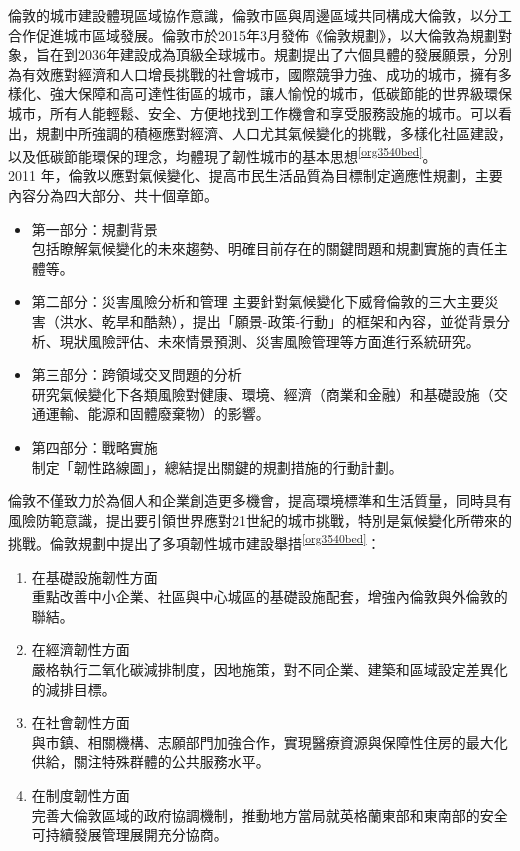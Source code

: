 \documentclass[a4paper,12pt]{article}
\begin{document}
\begin{enumerate}
倫敦的城市建設體現區域協作意識，倫敦市區與周邊區域共同構成大倫敦，以分工合作促進城市區域發展。倫敦市於2015年3月發佈《倫敦規劃》，以大倫敦為規劃對象，旨在到2036年建設成為頂級全球城市。規劃提出了六個具體的發展願景，分別為有效應對經濟和人口增長挑戰的社會城市，國際競爭力強、成功的城市，擁有多樣化、強大保障和高可達性街區的城市，讓人愉悅的城市，低碳節能的世界級環保城市，所有人能輕鬆、安全、方便地找到工作機會和享受服務設施的城市。可以看出，規劃中所強調的積極應對經濟、人口尤其氣候變化的挑戰，多樣化社區建設，以及低碳節能環保的理念，均體現了韌性城市的基本思想\textsuperscript{\ref{org3540bed}}。\\

2011 年，倫敦以應對氣候變化、提高市民生活品質為目標制定適應性規劃，主要內容分為四大部分、共十個章節。\\
\begin{itemize}
\item 第一部分：規劃背景\\
包括瞭解氣候變化的未來趨勢、明確目前存在的關鍵問題和規劃實施的責任主體等。\\
\item 第二部分：災害風險分析和管理  主要針對氣候變化下威脅倫敦的三大主要災害（洪水、乾旱和酷熱），提出「願景-政策-行動」的框架和內容，並從背景分析、現狀風險評估、未來情景預測、災害風險管理等方面進行系統研究。\\
\item 第三部分：跨領域交叉問題的分析\\
研究氣候變化下各類風險對健康、環境、經濟（商業和金融）和基礎設施（交通運輸、能源和固體廢棄物）的影響。\\
\item 第四部分：戰略實施\\
制定「韌性路線圖」，總結提出關鍵的規劃措施的行動計劃。\\
\end{itemize}

倫敦不僅致力於為個人和企業創造更多機會，提高環境標準和生活質量，同時具有風險防範意識，提出要引領世界應對21世紀的城市挑戰，特別是氣候變化所帶來的挑戰。倫敦規劃中提出了多項韌性城市建設舉措\textsuperscript{\ref{org3540bed}}：\\
\begin{enumerate}
\item 在基礎設施韌性方面\\
重點改善中小企業、社區與中心城區的基礎設施配套，增強內倫敦與外倫敦的聯結。\\
\item 在經濟韌性方面\\
嚴格執行二氧化碳減排制度，因地施策，對不同企業、建築和區域設定差異化的減排目標。\\
\item 在社會韌性方面\\
與市鎮、相關機構、志願部門加強合作，實現醫療資源與保障性住房的最大化供給，關注特殊群體的公共服務水平。\\
\item 在制度韌性方面\\
完善大倫敦區域的政府協調機制，推動地方當局就英格蘭東部和東南部的安全可持續發展管理展開充分協商。\\
\end{enumerate}


\end{enumerate}
\end{document}
